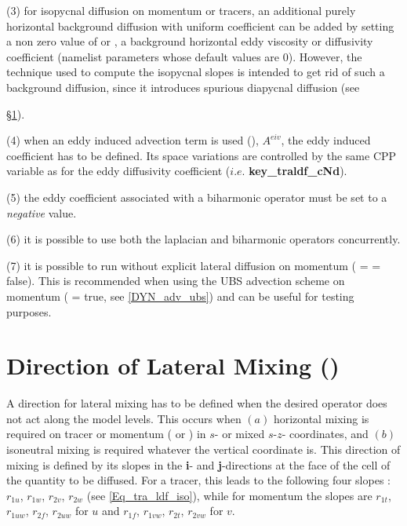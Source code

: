 (3) for isopycnal diffusion on momentum or tracers, an additional purely 
horizontal background diffusion with uniform coefficient can be added by 
setting a non zero value of  or , a background horizontal 
eddy viscosity or diffusivity coefficient (namelist parameters whose default 
values are $0$). However, the technique used to compute the isopycnal 
slopes is intended to get rid of such a background diffusion, since it introduces 
spurious diapycnal diffusion (see {\S\ref{LDF_slp}).

(4) when an eddy induced advection term is used (), $A^{eiv}$, 
the eddy induced coefficient has to be defined. Its space variations are controlled 
by the same CPP variable as for the eddy diffusivity coefficient ($i.e.$ 
\textbf{key\_traldf\_cNd}). 

(5) the eddy coefficient associated with a biharmonic operator must be set to a \emph{negative} value.

(6) it is possible to use both the laplacian and biharmonic operators concurrently.

(7) it is possible to run without explicit lateral diffusion on momentum ( = 
 = false). This is recommended when using the UBS advection 
scheme on momentum ( = true, see \ref{DYN_adv_ubs}) 
and can be useful for testing purposes.

\section  [Direction of Lateral Mixing (\textit{ldfslp})]
		{Direction of Lateral Mixing ()}
\label{LDF_slp}


A direction for lateral mixing has to be defined when the desired operator does 
not act along the model levels. This occurs when $(a)$ horizontal mixing is 
required on tracer or momentum ( or ) 
in $s$- or mixed $s$-$z$- coordinates, and $(b)$ isoneutral mixing is required 
whatever the vertical coordinate is. This direction of mixing is defined by its 
slopes in the \textbf{i}- and \textbf{j}-directions at the face of the cell of the 
quantity to be diffused. For a tracer, this leads to the following four slopes : 
$r_{1u}$, $r_{1w}$, $r_{2v}$, $r_{2w}$ (see \eqref{Eq_tra_ldf_iso}), while 
for momentum the slopes are  $r_{1t}$, $r_{1uw}$, $r_{2f}$, $r_{2uw}$ for 
$u$ and  $r_{1f}$, $r_{1vw}$, $r_{2t}$, $r_{2vw}$ for $v$. 

}
